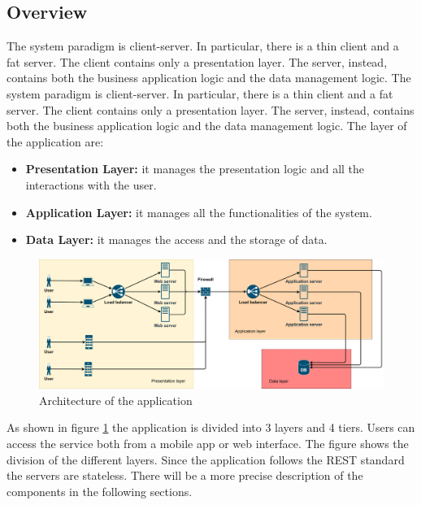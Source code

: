 \subsection{Overview}
The system paradigm is client-server. In particular, there is a thin client and a fat server. 
The client contains only a presentation layer. 
The server, instead, contains both the business application logic and the data management logic. 
The system paradigm is client-server. In particular, there is a thin client and a fat server. The client contains only a presentation layer. The server, instead, contains both the business application logic and the data management logic. 
The layer of the application are:
\begin{itemize}
    \item \textbf{Presentation Layer:} it manages the presentation logic and all the interactions with the user.
    \item \textbf{Application Layer:} it manages all the functionalities of the system.
    \item \textbf{Data Layer:} it manages the access and the storage of data.
\end{itemize}

\begin{figure}[H]
    \includegraphics[width=\textwidth,height=\textheight,keepaspectratio]{Images/architectureDesignDiagram.png}
    \caption{Architecture of the application}
    \label{fig:architectue_diagram}
\end{figure}

As shown in figure \ref{fig:architectue_diagram} the application is divided into 3 layers and 4 tiers. Users can access the service
both from a mobile app or web interface. The figure shows the division of the different layers. Since the application follows the 
REST standard the servers are stateless. There will be a more precise description of the components in the following sections.

